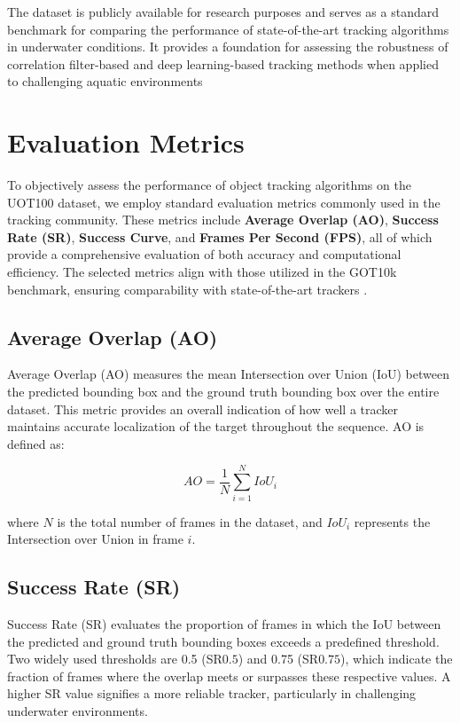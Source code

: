 The dataset is publicly available for research purposes and serves as a standard benchmark for comparing the performance of state-of-the-art tracking algorithms in underwater conditions. It provides a foundation for assessing the robustness of correlation filter-based and deep learning-based tracking methods when applied to challenging aquatic environments



\section{Evaluation Metrics}

To objectively assess the performance of object tracking algorithms on the UOT100 dataset, we employ standard evaluation metrics commonly used in the tracking community. These metrics include \textbf{Average Overlap (AO)}, \textbf{Success Rate (SR)}, \textbf{Success Curve}, and \textbf{Frames Per Second (FPS)}, all of which provide a comprehensive evaluation of both accuracy and computational efficiency. The selected metrics align with those utilized in the GOT10k benchmark, ensuring comparability with state-of-the-art trackers \cite{wu2013online}.

\subsection{Average Overlap (AO)}
Average Overlap (AO) measures the mean Intersection over Union (IoU) between the predicted bounding box and the ground truth bounding box over the entire dataset. This metric provides an overall indication of how well a tracker maintains accurate localization of the target throughout the sequence. AO is defined as:

\begin{equation}
AO = \frac{1}{N} \sum_{i=1}^{N} IoU_i
\end{equation}

where $N$ is the total number of frames in the dataset, and $IoU_i$ represents the Intersection over Union in frame $i$.

\subsection{Success Rate (SR)}
Success Rate (SR) evaluates the proportion of frames in which the IoU between the predicted and ground truth bounding boxes exceeds a predefined threshold. Two widely used thresholds are 0.5 (SR${0.5}$) and 0.75 (SR${0.75}$), which indicate the fraction of frames where the overlap meets or surpasses these respective values. A higher SR value signifies a more reliable tracker, particularly in challenging underwater environments.

